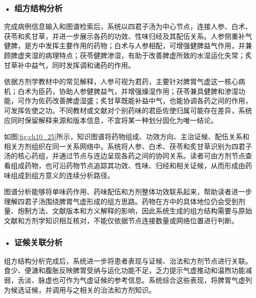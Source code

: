 \subsubsection*{\textbf{• 组方结构分析}}

完成病例信息输入和图谱检索后，系统以四君子汤为中心节点，连接人参、白术、茯苓和炙甘草，并进一步展示各药的功效、性味归经及其配伍关系。人参侧重补气健脾，是方中发挥主要作用的药物；白术与人参相配，可增强健脾益气作用，并兼顾脾虚夹湿的病理特点；茯苓健脾渗湿，有助于改善脾虚所致的水湿运化失常；炙甘草补中益气，同时发挥调和诸药的作用。

依据方剂学教材中的常见解释，人参可视为君药，主要针对脾胃气虚这一核心病机；白术为臣药，协助人参健脾益气，并增强燥湿作用；茯苓兼具健脾和渗湿功能，可作为佐药改善脾虚湿盛；炙甘草既能补益中气，也能协调各药之间的作用，可发挥佐使之功。不同教材或文献对个别药味的君臣佐使归属可能存在差异，系统应同时保留解释来源和版本信息，不宜将某一种划分固化为唯一结论。

如图\ref{fig:ch10_25}所示，知识图谱将药物组成、功效方向、主治证候、配伍关系和相关方剂组织在同一关系网络中。系统将人参、白术、茯苓和炙甘草识别为四君子汤的核心药组，并通过节点与连边呈现各药之间的协同关系。读者可由方剂节点查看组成药物，也可沿药物节点追踪其功效、性味、归经和相关证候，从而形成由药味组成到组方意义的连续分析路径。

\par
\noindent\begin{minipage}{\textwidth}
\centering
{}
\label{fig:ch10_25}
\end{minipage}
\par

图谱分析能够将单味药作用、药味配伍和方剂整体功效联系起来，帮助读者进一步理解四君子汤围绕脾胃气虚形成的组方思路。药物在方中的具体地位仍会受到剂量、炮制方法、文献版本和方义解释的影响，因此系统生成的组方结构需要与原始文献和方剂学知识相互核对，不能仅依据节点连接数量或网络位置进行判断。

\subsubsection*{\textbf{• 证候关联分析}}

组方结构分析完成后，系统进一步将患者表现与证候、治法和方剂节点进行关联。食少、便溏和腹胀反映脾胃受纳与运化功能不足，乏力提示气虚推动和温煦功能减弱，舌淡、脉虚也可作为气虚证候的参考信息。系统综合这些表现，将脾胃气虚列为候选证候，并调用与之相关的治法和方剂知识。

